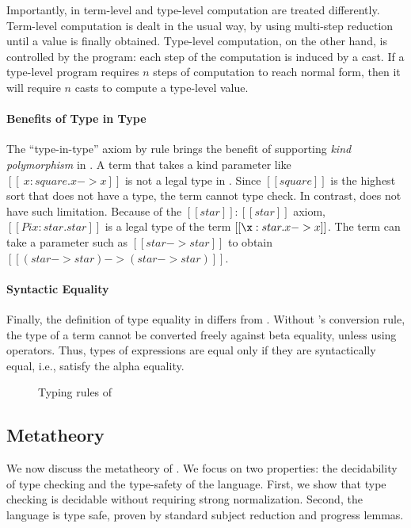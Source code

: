 Importantly, in \ecore term-level and type-level computation are treated 
differently. Term-level computation is dealt in the usual way, by 
using multi-step reduction until a value is finally obtained. 
Type-level computation, on the other hand, is controlled by the program:
each step of the computation is induced by a cast. If a type-level 
program requires $n$ steps of computation to reach normal form, 
then it will require $n$ casts to compute a type-level value.

\paragraph{Benefits of Type in Type}
The ``type-in-type'' axiom by rule  brings the benefit 
of supporting \emph{kind polymorphism} in \ecore.
A term that takes a kind parameter like $[[\
    x:square.x->x]]$ is not a legal type in \cc. Since $[[square]]$ is
the highest sort that does not have a type, the term cannot type check.
In contrast, \ecore does not have such limitation. Because of
the $[[star]]:[[star]]$ axiom, $[[Pi x:star.star]]$ is 
a legal type of the term $[[\x:star.x->x]]$. The term can take 
a parameter such as $[[star -> star]]$
to obtain $[[(star->star) -> (star -> star)]]$.

\paragraph{Syntactic Equality}
Finally, the definition of type equality in \ecore differs from
\cc. Without \cc's conversion rule, the type of a term cannot be
converted freely against beta equality, unless using \cast
operators. Thus, types of expressions are equal only if they are
syntactically equal, i.e., satisfy the alpha equality.

\begin{figure}
    \ottdefnctx{}\ottinterrule
    \ottdefnexpr{}
    \caption{Typing rules of \ecore}
    \label{fig:ecore:typing}
\end{figure}

\subsection{Metatheory}\label{sec:ecore:meta}
We now discuss the metatheory of \ecore. We focus on two properties:
the decidability of type checking and the type-safety of the
language. First, we show that type checking \ecore is decidable
without requiring strong normalization. Second, the language is type
safe, proven by standard subject reduction and progress lemmas.

